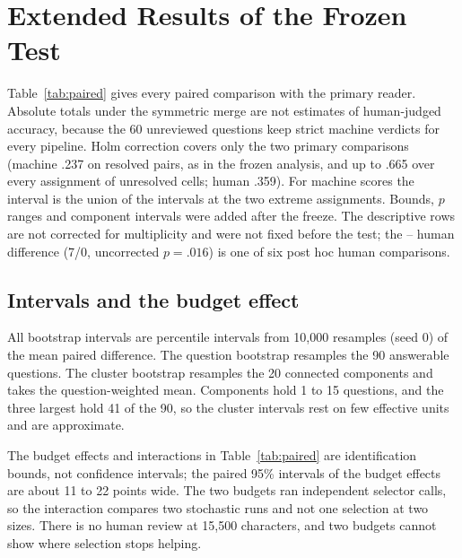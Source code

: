 \section{Extended Results of the Frozen Test}
\label{app:stats}

Table~\ref{tab:paired} gives every paired comparison with the primary reader. Absolute totals under the symmetric merge are not estimates of human-judged accuracy, because the 60 unreviewed questions keep strict machine verdicts for every pipeline. Holm correction covers only the two primary comparisons (machine .237 on resolved pairs, as in the frozen analysis, and up to .665 over every assignment of unresolved cells; human .359). For machine scores the interval is the union of the intervals at the two extreme assignments. Bounds, $p$ ranges and component intervals were added after the freeze. The descriptive rows are not corrected for multiplicity and were not fixed before the test; the \setr{}--\hybrid{} human difference (7/0, uncorrected $p=.016$) is one of six post hoc human comparisons.



\subsection{Intervals and the budget effect}
All bootstrap intervals are percentile intervals from 10,000 resamples (seed 0) of the mean paired difference. The question bootstrap resamples the 90 answerable questions. The cluster bootstrap resamples the 20 connected components and takes the question-weighted mean. Components hold 1 to 15 questions, and the three largest hold 41 of the 90, so the cluster intervals rest on few effective units and are approximate.

The budget effects and interactions in Table~\ref{tab:paired} are identification bounds, not confidence intervals; the paired 95\% intervals of the budget effects are about 11 to 22 points wide. The two \lexb{} budgets ran independent selector calls, so the interaction compares two stochastic runs and not one selection at two sizes. There is no human review at 15,500 characters, and two budgets cannot show where selection stops helping.

